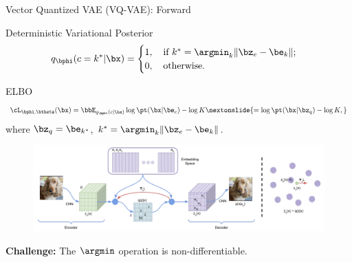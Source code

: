 \documentclass{beamer}
\begin{document}
\begin{frame}{Vector Quantized VAE (VQ-VAE): Forward}
	\begin{block}{Deterministic Variational Posterior}
		\vspace{-0.3cm}
		\[
			q_{\bphi}(c = k^* | \bx) = \begin{cases}
			1 , \quad \text{if } k^* = \argmin_k \| \bz_e - \be_k \|; \\
			0, \quad \text{otherwise}.
			\end{cases}
		\]
	\vspace{-0.5cm}
	\end{block}	
    \eqpause
	\begin{block}{ELBO}
		\vspace{-0.6cm}
		\[
			\cL_{\bphi, \btheta}(\bx)  = \bbE_{q_{\bphi}(c| \bx)} \log \pt(\bx| \be_{c}) - \log K \nextonslide{= \log \pt(\bx| \bz_q) - \log K,}
		\]
		where $\bz_q = \be_{k^*}$, $k^* = \argmin_k \| \bz_e - \be_k \|$.
	\end{block}
    \eqpause
	\vspace{-0.3cm} 
	\begin{figure}
		\centering
		\includegraphics[width=0.85\linewidth]{figs/vqvae}
	\end{figure}
    \eqpause
	\vspace{-0.3cm} 
	\textbf{Challenge:} The $\argmin$ operation is non-differentiable.
\end{frame}
\end{document}
